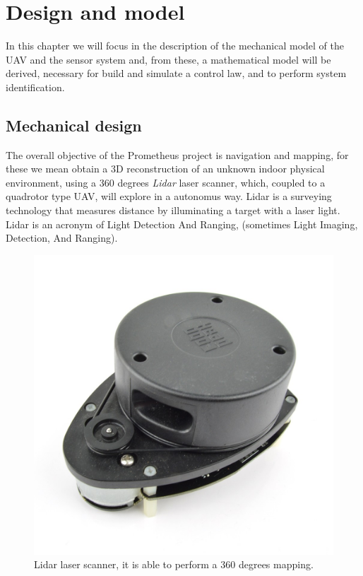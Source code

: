 \chapter{Design and model}
\label{designModel}

In this chapter we will focus in the description of the mechanical model of the UAV and the sensor system and, from these, a mathematical model will be derived, necessary for build and simulate a control law, and to perform system identification.

\section{Mechanical design}
\label{mechanicalDesign}

The overall objective of the Prometheus project is navigation and mapping, for these we mean obtain a 3D reconstruction of an unknown indoor physical environment, using a 360 degrees \textit{Lidar} laser scanner, which, coupled to a quadrotor type UAV, will explore in a autonomus way. Lidar is a surveying technology that measures distance by illuminating a target with a laser light. Lidar is an acronym of Light Detection And Ranging, (sometimes Light Imaging, Detection, And Ranging). 

\begin{figure}
	\includegraphics[scale=0.21]{images/lidar_laser.jpg}
	\caption{Lidar laser scanner, it is able to perform a 360 degrees mapping.}
	\label{fig:lidar}
\end{figure}

